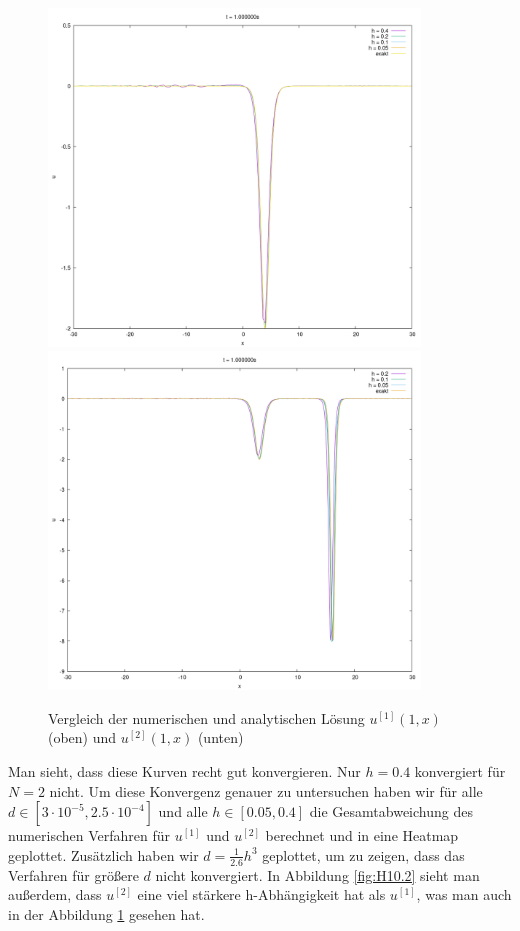 \documentclass[ngerman]{scrartcl}
\begin{document}
\begin{figure}[htbp]
	\centering
	\includegraphics[width=0.88\textwidth]{vergleichN1.png}
	\includegraphics[width=0.88\textwidth]{vergleichN2.png}
	\caption[Vergleich]{Vergleich der numerischen und analytischen Lösung $u^{[1]}(1,x)$ (oben) und $u^{[2]}(1,x)$ (unten)}
	\label{fig:H10.22}
\end{figure}
Man sieht, dass diese Kurven recht gut konvergieren.
Nur $h=0.4$ konvergiert f\"ur $N=2$ nicht.
Um diese Konvergenz genauer zu untersuchen haben wir f\"ur alle
$d\in[3\cdot10^{-5},2.5\cdot10^{-4}]$
und alle $h\in[0.05,0.4]$
die Gesamtabweichung des numerischen Verfahren f\"ur $u^{[1]}$ und $u^{[2]}$
berechnet und in eine Heatmap geplottet.
Zusätzlich haben wir $d=\frac{1}{2.6}h^3$ geplottet, um zu zeigen, dass das
Verfahren f\"ur größere $d$ nicht konvergiert.
In Abbildung \ref{fig:H10.2} sieht man außerdem, dass $u^{[2]}$ eine 
viel st\"arkere h-Abh\"angigkeit hat als $u^{[1]}$, was man auch in der Abbildung \ref{fig:H10.22} gesehen hat.
\end{document}
